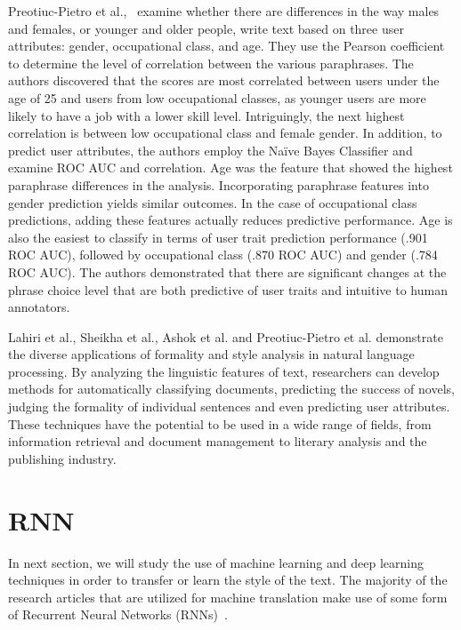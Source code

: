 \documentclass[akbc,twoside,11pt]{article}
\begin{document}
Preotiuc-Pietro et al.,~\cite{preotiuc2016discovering} examine whether there are differences in the way males and females, or younger and older people, write text based on three user attributes: gender, occupational class, and age. They use the Pearson coefficient to determine the level of correlation between the various paraphrases. The authors discovered that the scores are most correlated between users under the age of 25 and users from low occupational classes, as younger users are more likely to have a job with a lower skill level. Intriguingly, the next highest correlation is between low occupational class and female gender. In addition, to predict user attributes, the authors employ the Na\"{i}ve Bayes Classifier and examine ROC AUC and correlation. Age was the feature that showed the highest paraphrase differences in the analysis. Incorporating paraphrase features into gender prediction yields similar outcomes. In the case of occupational class predictions, adding these features actually reduces predictive performance. Age is also the easiest to classify in terms of user trait prediction performance (.901 ROC AUC), followed by occupational class (.870 ROC AUC) and gender (.784 ROC AUC). The authors demonstrated that there are significant changes at the phrase choice level that are both predictive of user traits and intuitive to human annotators.

Lahiri et al., Sheikha et al.,  Ashok et al. and Preotiuc-Pietro et al. demonstrate the diverse applications of formality and style analysis in natural language processing. By analyzing the linguistic features of text, researchers can develop methods for automatically classifying documents, predicting the success of novels, judging the formality of individual sentences and even predicting user attributes. These techniques have the potential to be used in a wide range of fields, from information retrieval and document management to literary analysis and the publishing industry.

\section{RNN}

In next section, we will study the use of machine learning and deep learning techniques in order to transfer or learn the style of the text. The majority of the research articles that are utilized for machine translation make use of some form of Recurrent Neural Networks (RNNs)~\cite{schmidt2019recurrent}. 
\end{document}
